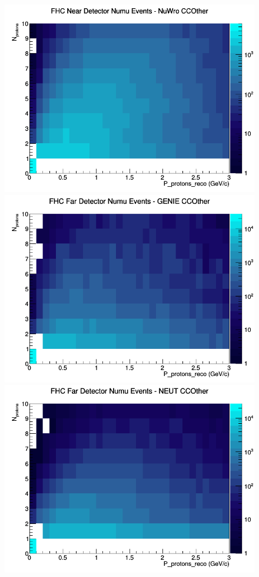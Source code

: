 \documentclass[12pt]{article}
\begin{document}
\begin{figure}[h]
\includegraphics[width=\linewidth]{eff_N_P/GAr/protons/CCOther_FHC_ND_numu_N_P_NuWro.png}
\endminipage
\newline
{}
\includegraphics[width=\linewidth]{eff_N_P/GAr/protons/CCOther_FHC_FD_numu_N_P_GENIE.png}
\endminipage
{}
\includegraphics[width=\linewidth]{eff_N_P/GAr/protons/CCOther_FHC_FD_numu_N_P_NEUT.png}

\end{figure}
\end{document}
